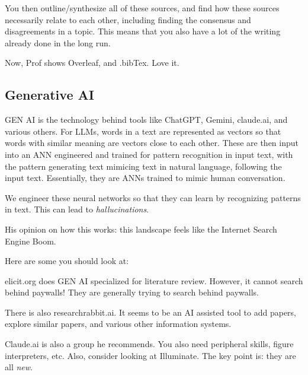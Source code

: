 \documentclass[10pt, oneside]{article}
\begin{document}
You then outline/synthesize all of these sources, and find how these sources necessarily relate to each other, including finding the consensus and disagreements in a topic. This means that you also have a lot of the writing already done in the long run. 

Now, Prof shows Overleaf, and .bibTex. Love it. 

\subsection{Generative AI}
GEN AI is the technology behind tools like ChatGPT, Gemini, claude.ai, and various others. 
For LLMs, words in a text are represented as vectors so that words with similar meaning are vectors close to each other. These are then input into an ANN engineered and trained for pattern recognition in input text, with the pattern generating text mimicing text in natural language, following the input text. Essentially, they are ANNs trained to mimic human conversation. 

We engineer these neural networks so that they can learn by recognizing patterns in text. This can lead to \textit{hallucinations}. 

His opinion on how this works: this landscape feels like the Internet Search Engine Boom. 

Here are some you should look at:

elicit.org does GEN AI specialized for literature review. However, it cannot search behind paywalls! They are generally trying to search behind paywalls. 

There is also researchrabbit.ai. It seems to be an AI assisted tool to add papers, explore similar papers, and various other information systems. 

Claude.ai is also a group he recommends. You also need peripheral skills, figure interpreters, etc. Also, consider looking at Illuminate. The key point is: they are all \textit{new}. 
\end{document}
